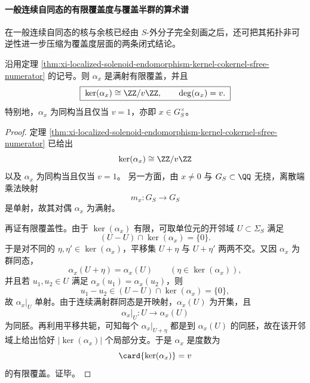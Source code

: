 \paragraph{一般连续自同态的有限覆盖度与覆盖半群的算术谱}
在一般连续自同态的核与余核已经由 \(S\)-外分子完全刻画之后，还可把其拓扑非可逆性进一步压缩为覆盖度层面的两条闭式结论。

\begin{corollary}\label{cor:xi-localized-solenoid-nonzero-endomorphism-finite-cover-degree}
沿用定理 \ref{thm:xi-localized-solenoid-endomorphism-kernel-cokernel-sfree-numerator} 的记号。则 \(\alpha_x\) 是满射有限覆盖，并且
\[
\boxed{\;
\ker(\alpha_x)\cong \ZZ/v\ZZ,
\qquad
\deg(\alpha_x)=v.\;}
\]
特别地，\(\alpha_x\) 为同构当且仅当 \(v=1\)，亦即 \(x\in G_S^\times\)。
\end{corollary}
\begin{proof}
定理 \ref{thm:xi-localized-solenoid-endomorphism-kernel-cokernel-sfree-numerator} 已给出
\[
\ker(\alpha_x)\cong \ZZ/v\ZZ
\]
以及 \(\alpha_x\) 为同构当且仅当 \(v=1\)。
另一方面，由 \(x\neq 0\) 与 \(G_S\subset \QQ\) 无挠，离散端乘法映射
\[
m_x:G_S\to G_S
\]
是单射，故其对偶 \(\alpha_x\) 为满射。

再证有限覆盖性。由于 \(\ker(\alpha_x)\) 有限，可取单位元的开邻域 \(U\subset \Sigma_S\) 满足
\[
(U-U)\cap \ker(\alpha_x)=\{0\}.
\]
于是对不同的 \(\eta,\eta'\in \ker(\alpha_x)\)，平移集 \(U+\eta\) 与 \(U+\eta'\) 两两不交。又因 \(\alpha_x\) 为群同态，
\[
\alpha_x(U+\eta)=\alpha_x(U)
\qquad
(\eta\in \ker(\alpha_x)),
\]
并且若 \(u_1,u_2\in U\) 满足 \(\alpha_x(u_1)=\alpha_x(u_2)\)，则
\[
u_1-u_2\in (U-U)\cap \ker(\alpha_x)=\{0\},
\]
故 \(\alpha_x|_U\) 单射。由于连续满射群同态是开映射，\(\alpha_x(U)\) 为开集，且
\[
\alpha_x|_U:U\longrightarrow \alpha_x(U)
\]
为同胚。再利用平移共轭，可知每个 \(\alpha_x|_{U+\eta}\) 都是到 \(\alpha_x(U)\) 的同胚，故在该开邻域上给出恰好 \(|\ker(\alpha_x)|\) 个局部分支。于是 \(\alpha_x\) 是度数为
\[
\card{\ker(\alpha_x)}=v
\]
的有限覆盖。证毕。
\end{proof}

